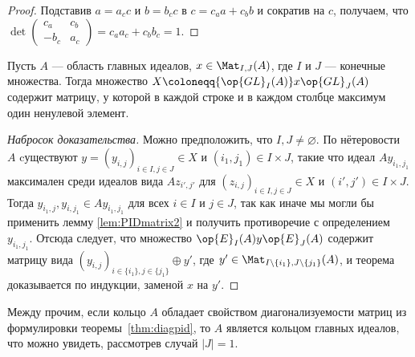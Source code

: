 \documentclass[
	extrafontsizes,
	11pt,
	hyphens,
]{memoir}
\begin{document}
\begin{proof}
Подставив \(a = a_c c\) и \(b = b_c c\) в \(c = c_a a + c_b b\) и сократив на \(c\), получаем, что
\(
\det
(
\begin{smallmatrix}
    c_a & c_b \\
    -b_c & a_c
\end{smallmatrix}
)
= c_a a_c + c_b b_c
= 1
\).
\end{proof}

\begin{theorem}
\label{thm:diagpid}
Пусть \(A\) --- область главных идеалов,
\(x \in \Mat_{I,J}(A)\), где \(I\) и \(J\) --- конечные множества. Тогда множество
\(X \coloneqq {\op{GL}_I(A)} x {\op{GL}_J(A)}\)
содержит матрицу, у которой в каждой строке и в каждом столбце максимум один ненулевой элемент.
\end{theorem}

\begin{proof}[Набросок доказательства]
Можно предположить, что \(I,J \neq \varnothing\).
По нётеровости \(A\) cуществуют \(y = (y_{i,j})_{i \in I, j \in J} \in X\) и \((i_1,j_1) \in I \times J\), такие что идеал \(Ay_{i_1,j_1}\) максимален среди идеалов вида \(Az_{i',j'}\) для \((z_{i,j})_{i \in I, j \in J} \in X\) и \((i',j') \in I \times J\).
Тогда \(y_{i_1,j}, y_{i,j_1} \in A y_{i_1,j_1}\) для всех \(i \in I\) и \(j \in J\), так как иначе мы могли бы применить лемму \ref{lem:PIDmatrix2} и получить противоречие с определением \(y_{i_1,j_1}\).
Отсюда следует, что множество \(\op{E}_I(A)y\op{E}_J(A)\)
содержит матрицу вида \((y_{i,j})_{i \in \{i_1\}, j \in \{j_1\}} \oplus y'\), где \(y' \in \Mat_{I \setminus \{i_1\},J \setminus \{j_1\}}(A)\), и
теорема доказывается по индукции, заменой \(x\) на \(y'\).
\end{proof}

\begin{remark}
Между прочим, если кольцо \(A\) обладает свойством диагонализуемости матриц из формулировки теоремы~\ref{thm:diagpid}, то \(A\) является кольцом главных идеалов, что можно увидеть, рассмотрев случай \(\lvert J \rvert = 1\).
\end{remark}
\end{document}
